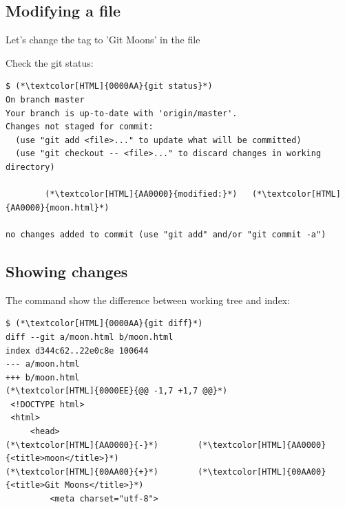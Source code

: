 \subsection{Modifying a file}
\begin{frame}[fragile]
  \subslidetitle

  Let's change the  tag to 'Git Moons' in the  file

  Check the git status:
  \begin{lstlisting}
$ (*\textcolor[HTML]{0000AA}{git status}*)
On branch master
Your branch is up-to-date with 'origin/master'.
Changes not staged for commit:
  (use "git add <file>..." to update what will be committed)
  (use "git checkout -- <file>..." to discard changes in working directory)

        (*\textcolor[HTML]{AA0000}{modified:}*)   (*\textcolor[HTML]{AA0000}{moon.html}*)

no changes added to commit (use "git add" and/or "git commit -a")
\end{lstlisting}
\end{frame}

\subsection{Showing changes}
\begin{frame}[fragile]
  \subslidetitle

  The command  show the difference between working tree and index:
  \begin{lstlisting}
$ (*\textcolor[HTML]{0000AA}{git diff}*)
diff --git a/moon.html b/moon.html
index d344c62..22e0c8e 100644
--- a/moon.html
+++ b/moon.html
(*\textcolor[HTML]{0000EE}{@@ -1,7 +1,7 @@}*)
 <!DOCTYPE html>
 <html>
     <head>
(*\textcolor[HTML]{AA0000}{-}*)        (*\textcolor[HTML]{AA0000}{<title>moon</title>}*)
(*\textcolor[HTML]{00AA00}{+}*)        (*\textcolor[HTML]{00AA00}{<title>Git Moons</title>}*)
         <meta charset="utf-8">
\end{lstlisting}
\end{frame}

